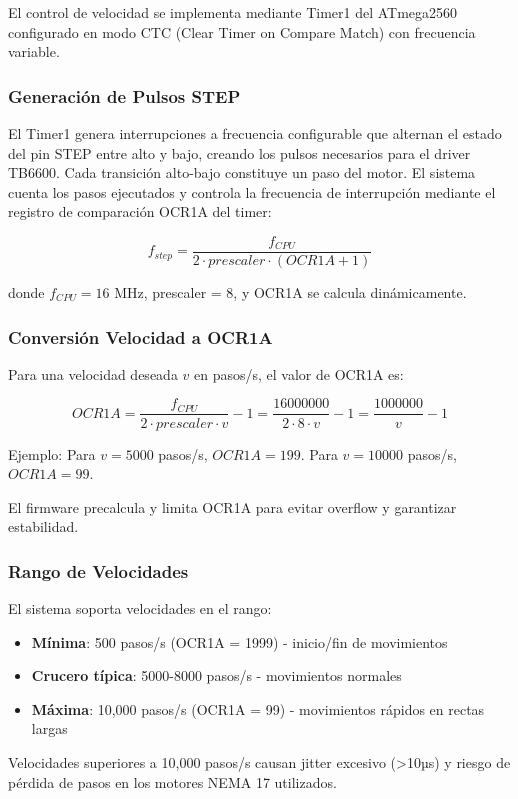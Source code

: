 El control de velocidad se implementa mediante Timer1 del ATmega2560 configurado en modo CTC (Clear Timer on Compare Match) con frecuencia variable.

\subsubsection{Generación de Pulsos STEP}

El Timer1 genera interrupciones a frecuencia configurable que alternan el estado del pin STEP entre alto y bajo, creando los pulsos necesarios para el driver TB6600. Cada transición alto-bajo constituye un paso del motor. El sistema cuenta los pasos ejecutados y controla la frecuencia de interrupción mediante el registro de comparación OCR1A del timer:

\begin{equation}
f_{step} = \frac{f_{CPU}}{2 \cdot prescaler \cdot (OCR1A + 1)}
\end{equation}

donde $f_{CPU} = 16$ MHz, prescaler = 8, y OCR1A se calcula dinámicamente.

\subsubsection{Conversión Velocidad a OCR1A}

Para una velocidad deseada $v$ en pasos/s, el valor de OCR1A es:

\begin{equation}
OCR1A = \frac{f_{CPU}}{2 \cdot prescaler \cdot v} - 1 = \frac{16000000}{2 \cdot 8 \cdot v} - 1 = \frac{1000000}{v} - 1
\end{equation}

Ejemplo: Para $v = 5000$ pasos/s, $OCR1A = 199$. Para $v = 10000$ pasos/s, $OCR1A = 99$.

El firmware precalcula y limita OCR1A para evitar overflow y garantizar estabilidad.

\subsubsection{Rango de Velocidades}

El sistema soporta velocidades en el rango:

\begin{itemize}
    \item \textbf{Mínima}: 500 pasos/s (OCR1A = 1999) - inicio/fin de movimientos
    \item \textbf{Crucero típica}: 5000-8000 pasos/s - movimientos normales
    \item \textbf{Máxima}: 10,000 pasos/s (OCR1A = 99) - movimientos rápidos en rectas largas
\end{itemize}

Velocidades superiores a 10,000 pasos/s causan jitter excesivo (>10µs) y riesgo de pérdida de pasos en los motores NEMA 17 utilizados.

